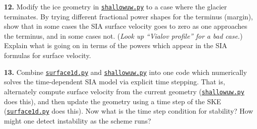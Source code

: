 \documentclass[12pt]{amsart}
\newcommand{\prob}[1]{\bigskip\noindent\textbf{#1.}\quad }
\begin{document}
\prob{12}  Modify the ice geometry in \href{https://github.com/bueler/mccarthy/blob/master/py/shallowuw.py}{\texttt{shallowuw.py}} to a case where the glacier terminates.  By trying different fractional power shapes for the terminus (margin), show that in some cases the SIA surface velocity goes to zero as one approaches the terminus, and in some cases not.  (\emph{Look up ``Vialov profile'' for a bad case.})  Explain what is going on in terms of the powers which appear in the SIA formulas for surface velocity.

\prob{13}  Combine \href{https://github.com/bueler/mccarthy/blob/master/py/surface1d.py}{\texttt{surface1d.py}} and \href{https://github.com/bueler/mccarthy/blob/master/py/shallowuw.py}{\texttt{shallowuw.py}} into one code which numerically solves the time-dependent SIA model via explicit time stepping.  That is, alternately compute surface velocity from the current geometry (\href{https://github.com/bueler/mccarthy/blob/master/py/shallowuw.py}{\texttt{shallowuw.py}} does this), and then update the geometry using a time step of the SKE (\href{https://github.com/bueler/mccarthy/blob/master/py/surface1d.py}{\texttt{surface1d.py}} does this).  Now what is the time step condition for stability?  How might one detect instability as the scheme runs?
\end{document}
